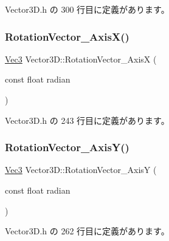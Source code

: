  Vector3\+D.\+h の 300 行目に定義があります。

\mbox{\label{class_vector3_d_a0b058c605bbea7ea97bd96efa3c0bc26}} 
\subsubsection{\texorpdfstring{Rotation\+Vector\+\_\+\+Axis\+X()}{RotationVector\_AxisX()}}
{\footnotesize\ttfamily \mbox{\hyperlink{_vector3_d_8h_ab16f59e4393f29a01ec8b9bbbabbe65d}{Vec3}} Vector3\+D\+::\+Rotation\+Vector\+\_\+\+AxisX (\begin{DoxyParamCaption}\item[{const float}]{radian }\end{DoxyParamCaption})\hspace{0.3cm}{\ttfamily [inline]}}



 Vector3\+D.\+h の 243 行目に定義があります。

\mbox{\label{class_vector3_d_a0a8556c9bd5caef8592174a8c095080f}} 
\subsubsection{\texorpdfstring{Rotation\+Vector\+\_\+\+Axis\+Y()}{RotationVector\_AxisY()}}
{\footnotesize\ttfamily \mbox{\hyperlink{_vector3_d_8h_ab16f59e4393f29a01ec8b9bbbabbe65d}{Vec3}} Vector3\+D\+::\+Rotation\+Vector\+\_\+\+AxisY (\begin{DoxyParamCaption}\item[{const float}]{radian }\end{DoxyParamCaption})\hspace{0.3cm}{\ttfamily [inline]}}



 Vector3\+D.\+h の 262 行目に定義があります。

\mbox{\label{class_vector3_d_ac893f738dde87e5981dcff5d5515ede6}} 
